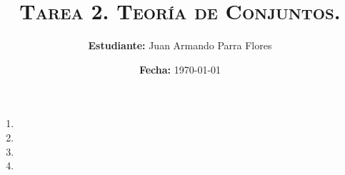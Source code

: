 \documentclass[11pt]{article}
\title{
    \textsc{
        \textbf{Tarea 2.} Teoría de Conjuntos.
    }
}
\author{
    \textbf{Estudiante:} Juan Armando Parra Flores
}
\date{
    \textbf{Fecha:} \today
}
\begin{document}
    \maketitle

    \begin{enumerate}
        \item
        \item
            
        \item
            
        \item
            
    \end{enumerate}

\end{document}
